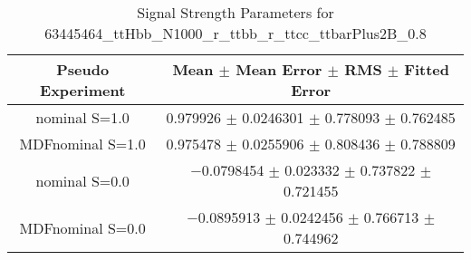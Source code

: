 \begin{table}
\centering
\caption{Signal Strength Parameters for 63445464\_ttHbb\_N1000\_r\_ttbb\_r\_ttcc\_ttbarPlus2B\_0.8}
\begin{tabular}{cc}
\toprule
Pseudo Experiment & Mean $\pm$ Mean Error $\pm$ RMS $\pm$ Fitted Error\\
\midrule
nominal S=1.0 & \num{0.979926} $\pm$ \num{0.0246301} $\pm$ \num{0.778093} $\pm$ \num{0.762485}\\
MDFnominal S=1.0 & \num{0.975478} $\pm$ \num{0.0255906} $\pm$ \num{0.808436} $\pm$ \num{0.788809}\\
nominal S=0.0 & \num{-0.0798454} $\pm$ \num{0.023332} $\pm$ \num{0.737822} $\pm$ \num{0.721455}\\
MDFnominal S=0.0 & \num{-0.0895913} $\pm$ \num{0.0242456} $\pm$ \num{0.766713} $\pm$ \num{0.744962}\\
\bottomrule
\end{tabular}
\end{table}